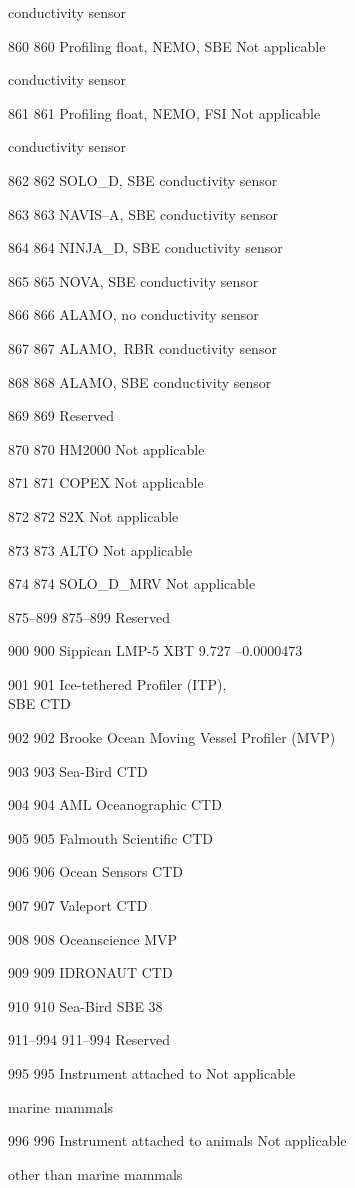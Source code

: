conductivity sensor

860 860 Profiling float, NEMO, SBE Not applicable

conductivity sensor

861 861 Profiling float, NEMO, FSI Not applicable

conductivity sensor

862 862 SOLO\_D, SBE conductivity sensor

863 863 NAVIS--A, SBE conductivity sensor

864 864 NINJA\_D, SBE conductivity sensor

865 865 NOVA, SBE conductivity sensor

866 866 ALAMO, no conductivity sensor

867 867 ALAMO,~RBR conductivity sensor

868 868 ALAMO, SBE conductivity sensor

869 869 Reserved

870 870 HM2000 Not applicable

871 871 COPEX Not applicable

872 872 S2X Not applicable

873 873 ALTO Not applicable

874 874 SOLO\_D\_MRV Not applicable

875--899 875--899 Reserved

900 900 Sippican LMP-5 XBT 9.727 --0.0000473

901 901 Ice-tethered Profiler (ITP),\\
SBE CTD

902 902 Brooke Ocean Moving Vessel Profiler (MVP)

903 903 Sea-Bird CTD

904 904 AML Oceanographic CTD

905 905 Falmouth Scientific CTD

906 906 Ocean Sensors CTD

907 907 Valeport CTD

908 908 Oceanscience MVP

909 909 IDRONAUT CTD

910 910 Sea-Bird SBE 38

911--994 911--994 Reserved

995 995 Instrument attached to Not applicable

marine mammals

996 996 Instrument attached to animals Not applicable

other than marine mammals


